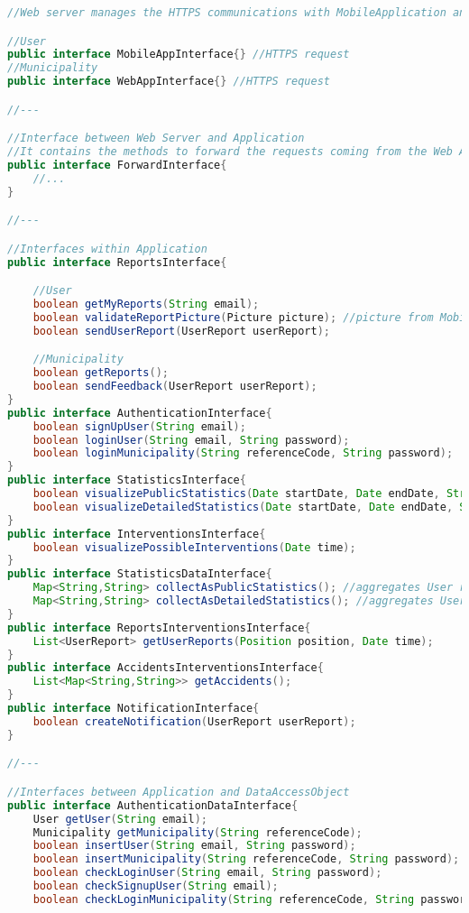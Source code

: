 \documentclass[../../DD.tex]{subfiles}
\begin{document}
\begin{lstlisting}[language=Java]
//Web server manages the HTTPS communications with MobileApplication and Browser

//User
public interface MobileAppInterface{} //HTTPS request
//Municipality
public interface WebAppInterface{} //HTTPS request

//---

//Interface between Web Server and Application
//It contains the methods to forward the requests coming from the Web Application to the Router in the Application
public interface ForwardInterface{
	//...
}

//---

//Interfaces within Application
public interface ReportsInterface{

	//User
	boolean getMyReports(String email);
	boolean validateReportPicture(Picture picture); //picture from Mobile Application
	boolean sendUserReport(UserReport userReport);

	//Municipality
	boolean getReports();
	boolean sendFeedback(UserReport userReport);
}
public interface AuthenticationInterface{
	boolean signUpUser(String email);
	boolean loginUser(String email, String password);
	boolean loginMunicipality(String referenceCode, String password);
}
public interface StatisticsInterface{
	boolean visualizePublicStatistics(Date startDate, Date endDate, String typeOfViolation, Position position);
	boolean visualizeDetailedStatistics(Date startDate, Date endDate, String typeOfViolation, Position position, String licensePlateNumber);
}
public interface InterventionsInterface{
	boolean visualizePossibleInterventions(Date time);
}
public interface StatisticsDataInterface{
	Map<String,String> collectAsPublicStatistics(); //aggregates User reports data
	Map<String,String> collectAsDetailedStatistics(); //aggregates User reports data
}
public interface ReportsInterventionsInterface{
	List<UserReport> getUserReports(Position position, Date time);
}
public interface AccidentsInterventionsInterface{
	List<Map<String,String>> getAccidents();
}
public interface NotificationInterface{
	boolean createNotification(UserReport userReport);
}

//---

//Interfaces between Application and DataAccessObject
public interface AuthenticationDataInterface{
	User getUser(String email);
	Municipality getMunicipality(String referenceCode);
	boolean insertUser(String email, String password);
	boolean insertMunicipality(String referenceCode, String password);
	boolean checkLoginUser(String email, String password);
	boolean checkSignupUser(String email);
	boolean checkLoginMunicipality(String referenceCode, String password);


\end{lstlisting}
\end{document}
